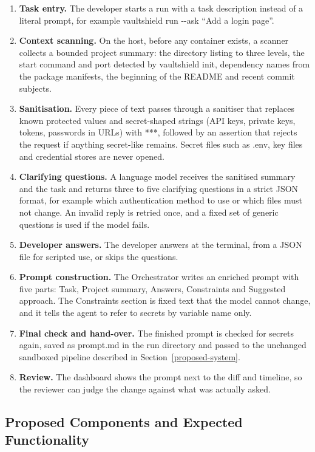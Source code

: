 \documentclass[12pt,a4paper,oneside]{report}
\providecommand{\tightlist}{\setlength{\itemsep}{0pt}\setlength{\parskip}{0pt}}
\begin{document}
\begin{enumerate}
\def\labelenumi{\arabic{enumi}.}
\tightlist
\item
  \textbf{Task entry.} The developer starts a run with a task description instead of a literal prompt, for example vaultshield run -\allowbreak{}-ask ``Add a login page''.
\item
  \textbf{Context scanning.} On the host, before any container exists, a scanner collects a bounded project summary: the directory listing to three levels, the start command and port detected by vaultshield init, dependency names from the package manifests, the beginning of the README and recent commit subjects.
\item
  \textbf{Sanitisation.} Every piece of text passes through a sanitiser that replaces known protected values and secret-shaped strings (API keys, private keys, tokens, passwords in URLs) with ***, followed by an assertion that rejects the request if anything secret-like remains. Secret files such as .env, key files and credential stores are never opened.
\item
  \textbf{Clarifying questions.} A language model receives the sanitised summary and the task and returns three to five clarifying questions in a strict JSON format, for example which authentication method to use or which files must not change. An invalid reply is retried once, and a fixed set of generic questions is used if the model fails.
\item
  \textbf{Developer answers.} The developer answers at the terminal, from a JSON file for scripted use, or skips the questions.
\item
  \textbf{Prompt construction.} The Orchestrator writes an enriched prompt with five parts: Task, Project summary, Answers, Constraints and Suggested approach. The Constraints section is fixed text that the model cannot change, and it tells the agent to refer to secrets by variable name only.
\item
  \textbf{Final check and hand-over.} The finished prompt is checked for secrets again, saved as prompt.md in the run directory and passed to the unchanged sandboxed pipeline described in Section~\ref{proposed-system}.
\item
  \textbf{Review.} The dashboard shows the prompt next to the diff and timeline, so the reviewer can judge the change against what was actually asked.
\end{enumerate}

\subsection{Proposed Components and Expected Functionality}\label{orchestrator-components}
\end{document}

